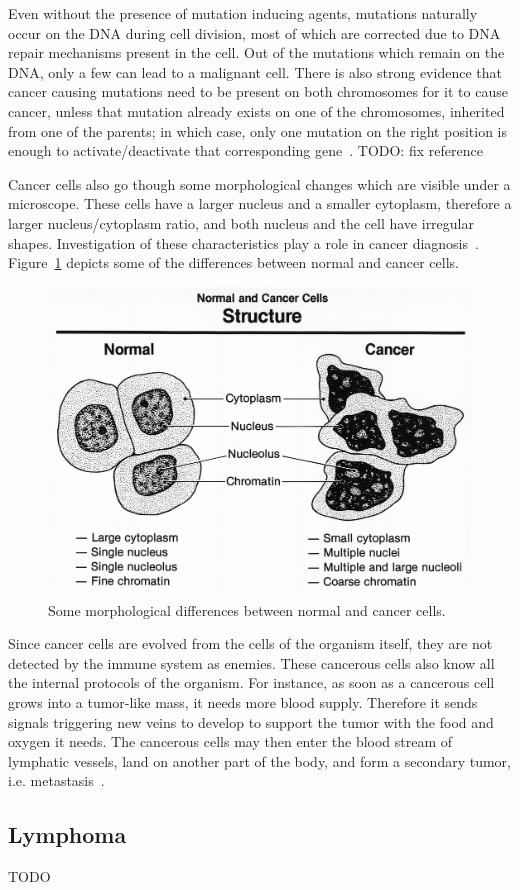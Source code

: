 Even without the presence of mutation inducing agents, mutations naturally occur on the DNA during cell division, most of which are corrected due to DNA repair mechanisms present in the cell. Out of the mutations which remain on the DNA, only a few can lead to a malignant cell. There is also strong evidence that cancer causing mutations need to be present on both chromosomes for it to cause cancer, unless that mutation already exists on one of the chromosomes, inherited from one of the parents; in which case, only one mutation on the right position is enough to activate/deactivate that corresponding gene~\cite{mutation-both-chromosomes}. TODO: fix reference 

Cancer cells also go though some morphological changes which are visible under a microscope. These cells have a larger nucleus and a smaller cytoplasm, therefore a larger nucleus/cytoplasm ratio, and both nucleus and the cell have irregular shapes. Investigation of these characteristics play a role in cancer diagnosis~\cite{baba2007tumor}. Figure~\ref{fig:bkg:normal-cancer} depicts some of the differences between normal and cancer cells.

\begin{figure}[!ht]
  \centering
  \includegraphics[width=.8\textwidth]{figs/background/Normal_and_cancer_cells_structure}
  \caption{Some morphological differences between normal and cancer cells.}
  \label{fig:bkg:normal-cancer}
\end{figure}

Since cancer cells are evolved from the cells of the organism itself, they are not detected by the immune system as enemies. These cancerous cells also know all the internal protocols of the organism. For instance, as soon as a cancerous cell grows into a tumor-like mass, it needs more blood supply. Therefore it sends signals triggering new veins to develop to support the tumor with the food and oxygen it needs. The cancerous cells may then enter the blood stream of lymphatic vessels, land on another part of the body, and form a secondary tumor, i.e. metastasis~\cite[Ch. 20]{the-cell}.


\subsection{Lymphoma}
TODO
